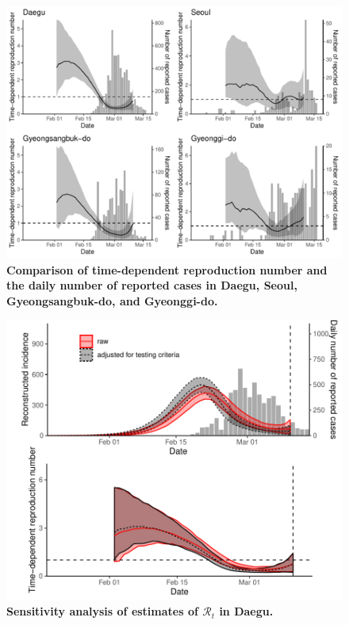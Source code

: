 \begin{figure}[!ht]
\includegraphics[width=\textwidth]{figure_R_t_all.pdf}
\caption{
\textbf{Comparison of time-dependent reproduction number and the daily number of reported cases in Daegu, Seoul, Gyeongsangbuk-do, and Gyeonggi-do.}
}
\end{figure}

\pagebreak

\begin{figure}[!ht]
\includegraphics[width=\textwidth]{figure_R_t_daegu.pdf}
\caption{
\textbf{Sensitivity analysis of estimates of $\mathcal R_t$ in Daegu.}
}
\end{figure}

